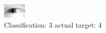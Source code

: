 \begin{figure}[h!]
\begin{center}
\includegraphics[width=0.60\columnwidth]{figures/ID2473_class_3_target_4.png}
\end{center}
\caption{ Classification: 3 actual target: 4}
\label{fig:ID2473_class_3_target_4}
\end{figure}
